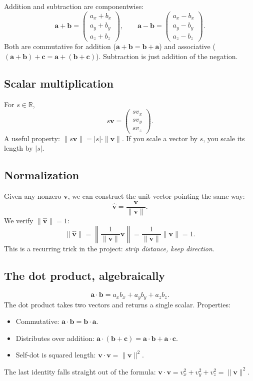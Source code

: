\documentclass{article}
\begin{document}
Addition and subtraction are componentwise:
\[
\mathbf{a} + \mathbf{b} = \begin{pmatrix} a_x + b_x \\ a_y + b_y \\ a_z + b_z \end{pmatrix},
\qquad
\mathbf{a} - \mathbf{b} = \begin{pmatrix} a_x - b_x \\ a_y - b_y \\ a_z - b_z \end{pmatrix}.
\]
Both are commutative for addition ($\mathbf{a}+\mathbf{b} = \mathbf{b}+\mathbf{a}$)
and associative ($(\mathbf{a}+\mathbf{b})+\mathbf{c} = \mathbf{a}+(\mathbf{b}+\mathbf{c})$).
Subtraction is just addition of the negation.

\subsection{Scalar multiplication}

For $s \in \mathbb{R}$,
\[
s\mathbf{v} = \begin{pmatrix} s v_x \\ s v_y \\ s v_z \end{pmatrix}.
\]
A useful property:
$\|s\mathbf{v}\| = |s| \cdot \|\mathbf{v}\|$. If you scale a vector by $s$, you
scale its length by $|s|$.

\subsection{Normalization}

Given any nonzero $\mathbf{v}$, we can construct the unit vector pointing the
same way:
\[
\hat{\mathbf{v}} = \frac{\mathbf{v}}{\|\mathbf{v}\|}.
\]
We verify $\|\hat{\mathbf{v}}\| = 1$:
\[
\|\hat{\mathbf{v}}\| = \left\|\frac{1}{\|\mathbf{v}\|}\mathbf{v}\right\|
   = \frac{1}{\|\mathbf{v}\|}\|\mathbf{v}\| = 1.
\]
This is a recurring trick in the project: \emph{strip distance, keep
direction.}

\subsection{The dot product, algebraically}

\[
\mathbf{a} \cdot \mathbf{b} = a_x b_x + a_y b_y + a_z b_z.
\]
The dot product takes two vectors and returns a single scalar. Properties:
\begin{itemize}
  \item Commutative: $\mathbf{a} \cdot \mathbf{b} = \mathbf{b} \cdot \mathbf{a}$.
  \item Distributes over addition: $\mathbf{a} \cdot (\mathbf{b}+\mathbf{c}) = \mathbf{a}\cdot\mathbf{b} + \mathbf{a}\cdot\mathbf{c}$.
  \item Self-dot is squared length: $\mathbf{v} \cdot \mathbf{v} = \|\mathbf{v}\|^2$.
\end{itemize}
The last identity falls straight out of the formula:
$\mathbf{v} \cdot \mathbf{v} = v_x^2 + v_y^2 + v_z^2 = \|\mathbf{v}\|^2$.
\end{document}
